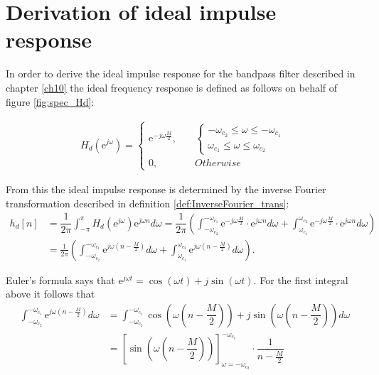 \chapter{Derivation of ideal impulse response}\label{appC}
In order to derive the ideal impulse response for the bandpass filter described in chapter \ref{ch10} the ideal frequency response is defined as follows on behalf of figure \ref{fig:spec_Hd}:

\begin{align*}
H_d(\text{e}^{j\omega}) = \begin{cases}
\text{e}^{-j\omega\frac{M}{2}}, \quad &\begin{cases}
-\omega_{c_2} \leq \omega \leq -\omega_{c_1} \\
\omega_{c_1} \leq \omega \leq \omega_{c_2}
\end{cases} \\
0, \quad &Otherwise
\end{cases}
\end{align*}

From this the ideal impulse response is determined by the inverse Fourier transformation described in definition \ref{def:InverseFourier_trans}:
\begin{align*}
h_d[n] &= \dfrac{1}{2\pi} \int_{-\pi}^\pi H_d(\text{e}^{j\omega}) \text{e}^{j\omega n} d\omega = \dfrac{1}{2\pi} \left(  \int_{-\omega_{c_2}}^{-\omega_{c_1}} \text{e}^{-j\omega \frac{M}{2}} \cdot \text{e}^{j \omega n} d\omega + \int_{\omega_{c_1}}^{\omega_{c_2}} \text{e}^{-j\omega \frac{M}{2}} \cdot \text{e}^{j \omega n} d\omega \right) \\
&= \frac{1}{2\pi} \left( \int_{-\omega_{c_2}}^{-\omega_{c_1}} \text{e}^{j\omega \left(n - \frac{M}{2} \right) } d\omega + \int_{\omega_{c_1}}^{\omega_{c_2}} \text{e}^{j\omega \left(n- \frac{M}{2} \right)} d\omega \right).
\end{align*}

Euler's formula says that $\text{e}^{j\omega t} = \cos(\omega t) + j\sin(\omega t)$. For the first integral above it follows that
\begin{align*}
\int_{-\omega_{c_2}}^{-\omega_{c_1}} \text{e}^{j\omega \left(n- \frac{M}{2} \right)} d\omega &= \int_{-\omega_{c_2}}^{-\omega_{c_1}} \cos \left( \omega \left(n-\dfrac{M}{2}\right)\right) + j \sin \left( \omega \left(n-\dfrac{M}{2}\right) \right) d\omega \\
&= \left[ \sin\left(\omega \left(n-\dfrac{M}{2}\right)\right) \right]_{\omega=-\omega_{c_2}}^{-\omega_{c_1}} \cdot \dfrac{1}{n - \frac{M}{2}}
\end{align*}

